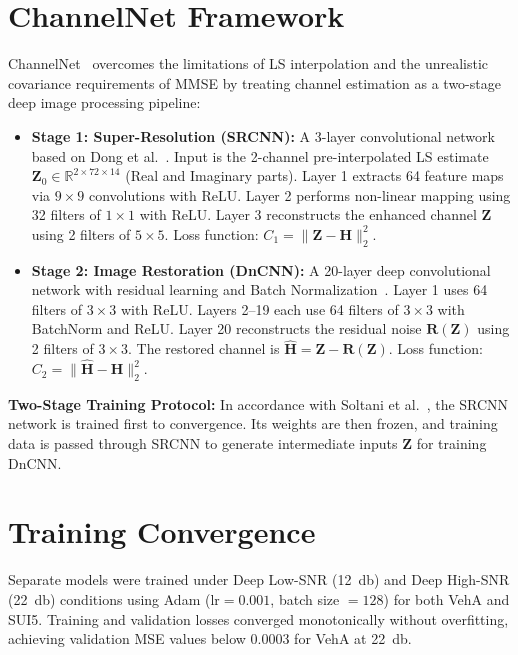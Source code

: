 \documentclass[10pt,a4paper]{article}
\begin{document}
\section{ChannelNet Framework}
\label{sec:channelnet}
ChannelNet~\cite{soltani2019deep} overcomes the limitations of LS interpolation and the unrealistic covariance requirements of MMSE by treating channel estimation as a two-stage deep image processing pipeline:
\begin{itemize}\setlength{\itemsep}{1pt}\setlength{\parskip}{0pt}
  \item \textbf{Stage 1: Super-Resolution (SRCNN):} A 3-layer convolutional network based on Dong et al.~\cite{dong2016image}. Input is the 2-channel pre-interpolated LS estimate $\mathbf{Z}_0 \in \mathbb{R}^{2 \times 72 \times 14}$ (Real and Imaginary parts). Layer 1 extracts 64 feature maps via $9 \times 9$ convolutions with ReLU. Layer 2 performs non-linear mapping using 32 filters of $1 \times 1$ with ReLU. Layer 3 reconstructs the enhanced channel $\mathbf{Z}$ using 2 filters of $5 \times 5$. Loss function: $C_1 = \lVert \mathbf{Z} - \mathbf{H} \rVert_2^2$.
  \item \textbf{Stage 2: Image Restoration (DnCNN):} A 20-layer deep convolutional network with residual learning and Batch Normalization~\cite{zhang2017beyond}. Layer 1 uses 64 filters of $3 \times 3$ with ReLU. Layers 2--19 each use 64 filters of $3 \times 3$ with BatchNorm and ReLU. Layer 20 reconstructs the residual noise $\mathbf{R}(\mathbf{Z})$ using 2 filters of $3 \times 3$. The restored channel is $\hat{\mathbf{H}} = \mathbf{Z} - \mathbf{R}(\mathbf{Z})$. Loss function: $C_2 = \lVert \hat{\mathbf{H}} - \mathbf{H} \rVert_2^2$.
\end{itemize}

\textbf{Two-Stage Training Protocol:} In accordance with Soltani et al.~\cite{soltani2019deep}, the SRCNN network is trained first to convergence. Its weights are then frozen, and training data is passed through SRCNN to generate intermediate inputs $\mathbf{Z}$ for training DnCNN.

\section{Training Convergence}
\label{sec:training}
Separate models were trained under Deep Low-SNR (\SI{12}{\decibel}) and Deep High-SNR (\SI{22}{\decibel}) conditions using Adam ($\text{lr} = 0.001$, batch size $= 128$) for both VehA and SUI5. Training and validation losses converged monotonically without overfitting, achieving validation MSE values below 0.0003 for VehA at \SI{22}{\decibel}.
\end{document}
